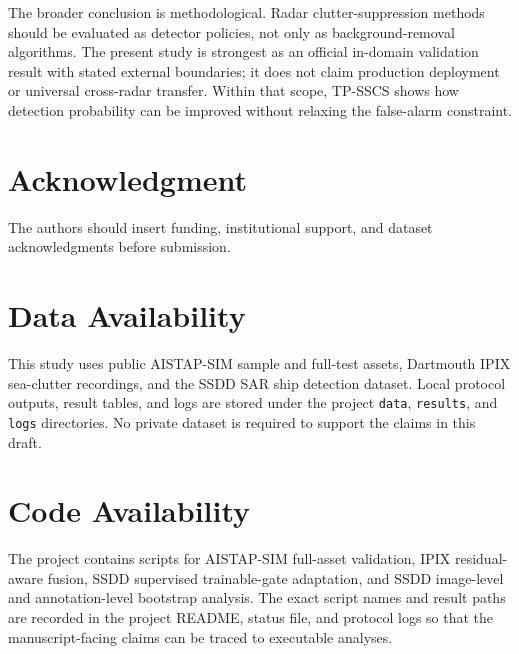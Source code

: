 \documentclass[journal]{IEEEtran}
\begin{document}
The broader conclusion is methodological. Radar clutter-suppression methods should be evaluated as detector policies, not only as background-removal algorithms. The present study is strongest as an official in-domain validation result with stated external boundaries; it does not claim production deployment or universal cross-radar transfer. Within that scope, TP-SSCS shows how detection probability can be improved without relaxing the false-alarm constraint.

\section*{Acknowledgment}

The authors should insert funding, institutional support, and dataset acknowledgments before submission.

\section*{Data Availability}

This study uses public AISTAP-SIM sample and full-test assets, Dartmouth IPIX sea-clutter recordings, and the SSDD SAR ship detection dataset. Local protocol outputs, result tables, and logs are stored under the project \texttt{data}, \texttt{results}, and \texttt{logs} directories. No private dataset is required to support the claims in this draft.

\section*{Code Availability}

The project contains scripts for AISTAP-SIM full-asset validation, IPIX residual-aware fusion, SSDD supervised trainable-gate adaptation, and SSDD image-level and annotation-level bootstrap analysis. The exact script names and result paths are recorded in the project README, status file, and protocol logs so that the manuscript-facing claims can be traced to executable analyses.
\end{document}
